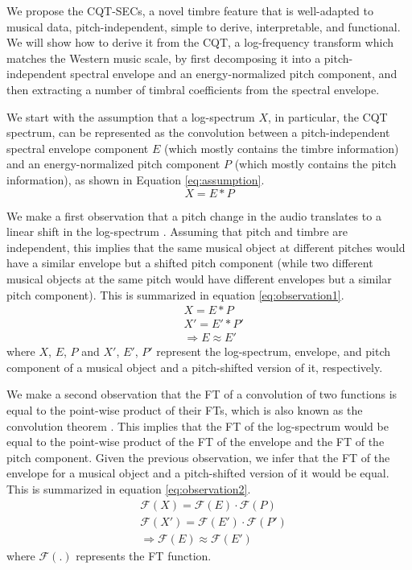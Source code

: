 \documentclass[journal]{IEEEtran}
\begin{document}
We propose the CQT-SECs, a novel timbre feature that is well-adapted to musical data, pitch-independent, simple to derive, interpretable, and functional. We will show how to derive it from the CQT, a log-frequency transform which matches the Western music scale, by first decomposing it into a pitch-independent spectral envelope and an energy-normalized pitch component, and then extracting a number of timbral coefficients from the spectral envelope. 

We start with the assumption that a log-spectrum $X$, in particular, the CQT spectrum, can be represented as the convolution between a pitch-independent spectral envelope component $E$ (which mostly contains the timbre information) and an energy-normalized pitch component $P$ (which mostly contains the pitch information), as shown in Equation \ref{eq:assumption}.
\begin{equation}
\label{eq:assumption}
X = E * P
\end{equation}

We make a first observation that a pitch change in the audio translates to a linear shift in the log-spectrum \cite{brown1991, brown1992}. Assuming that pitch and timbre are independent, this implies that the same musical object at different pitches would have a similar envelope but a shifted pitch component (while two different musical objects at the same pitch would have different envelopes but a similar pitch component). This is summarized in equation \ref{eq:observation1}.
\begin{equation}
\label{eq:observation1}
\begin{split}
&X = E * P \\
&X' = E' * P' \\
&\Rightarrow E \approx E'
\end{split}
\end{equation}
where $X$, $E$, $P$ and $X'$, $E'$, $P'$ represent the log-spectrum, envelope, and pitch component of a musical object and a pitch-shifted version of it, respectively.

We make a second observation that the FT of a convolution of two functions is equal to the point-wise product of their FTs, which is also known as the convolution theorem \cite{proakis1995}. This implies that the FT of the log-spectrum would be equal to the point-wise product of the FT of the envelope and the FT of the pitch component. Given the previous observation, we infer that the FT of the envelope for a musical object and a pitch-shifted version of it would be equal. This is summarized in equation \ref{eq:observation2}.
\begin{equation}
\label{eq:observation2}
\begin{split}
&\mathcal{F}(X) = \mathcal{F}(E) \cdot \mathcal{F}(P) \\
&\mathcal{F}(X') = \mathcal{F}(E') \cdot \mathcal{F}(P') \\
&\Rightarrow \mathcal{F}(E) \approx \mathcal{F}(E')
\end{split}
\end{equation}
where $\mathcal{F}(.)$ represents the FT function.
\end{document}

